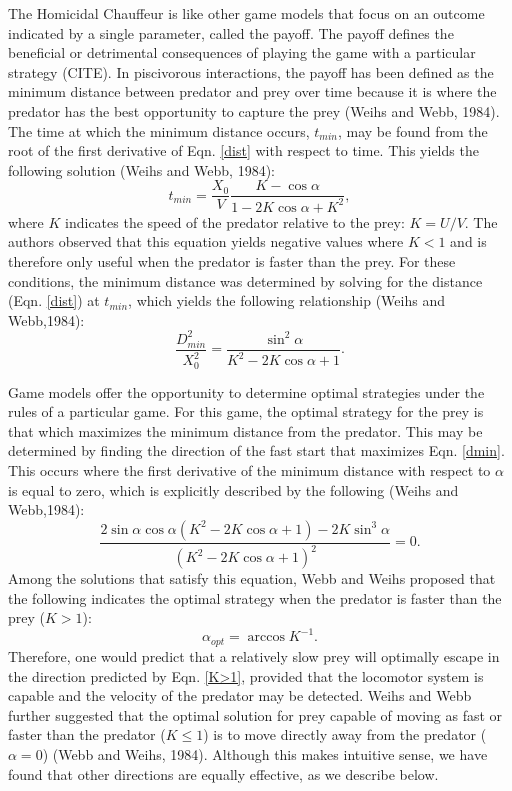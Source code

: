 \documentclass[12pt]{article}
\begin{document}
The Homicidal Chauffeur is like other game models that focus on an outcome indicated by a single parameter, called the payoff. The payoff defines the beneficial or detrimental consequences of playing the game with a particular strategy (CITE). In piscivorous interactions, the payoff has been defined as the minimum distance between predator and prey over time because it is where the predator has the best opportunity to capture the prey (Weihs and Webb, 1984). The time at which the minimum distance occurs, $t_{min}$, may be found from the root of the first derivative of Eqn. \ref{dist} with respect to time. This yields the following solution (Weihs and Webb, 1984):
%
\begin{equation}
t_{min} = \frac{X_0}{V} \frac{K-\cos\alpha}{1-2 K\cos\alpha+K^2},
\label{eq33weihs}	
\end{equation}
%
where $K$ indicates the speed of the predator relative to the prey: $K = U/V$. The authors observed that this equation yields negative values where $K<1$ and is therefore only useful when the predator is faster than the prey. For these conditions, the minimum distance was determined by solving for the distance (Eqn. \ref{dist}) at $t_{min}$, which yields the following relationship (Weihs and Webb,1984):
%
\begin{equation}
\frac{D^2_{min}}{X_0^2} = \frac{\sin^2\alpha}{K^2 - 2K \cos\alpha + 1}.
\label{dmin}
\end{equation}

Game models offer the opportunity to determine optimal strategies under the rules of a particular game. For this game, the optimal strategy for the prey is that which maximizes the minimum distance from the predator. This may be determined by finding the direction of the fast start that maximizes Eqn. \ref{dmin}. This occurs where the first derivative of the minimum distance with respect to $\alpha$ is equal to zero, which is explicitly described by the following (Weihs and Webb,1984):
%
\begin{equation}
\frac{2\sin\alpha \cos\alpha (K^2 -2 K \cos\alpha+1)-2 K \sin^3\alpha}{(K^2-2 K \cos\alpha + 1)^2} = 0. 
\label{eq37weihs}
\end{equation}
%
Among the solutions that satisfy this equation, Webb and Weihs proposed that the following indicates the optimal strategy when the predator is faster than the prey ($K > 1$):
%
\begin{equation}
\alpha_{opt} = \arccos K^{-1}. 
\label{K>1}
\end{equation}
%
Therefore, one would predict that a relatively slow prey will optimally escape in the direction predicted by Eqn. \ref{K>1}, provided that the locomotor system is capable and the velocity of the predator may be detected. Weihs and Webb further suggested that the optimal solution for prey capable of moving as fast or faster than the predator ($K\leq1$) is to move directly away from the predator ($\alpha = 0$) (Webb and Weihs, 1984). Although this makes intuitive sense, we have found that other directions are equally effective, as we describe below. 
\end{document}
